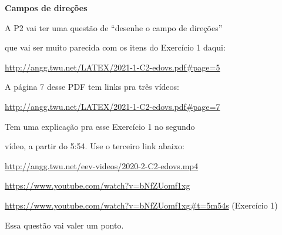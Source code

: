 \documentclass[oneside,12pt]{article}
\begin{document}
{\bf Campos de direções}

A P2 vai ter uma questão de ``desenhe o campo de direções''

que vai ser muito parecida com os itens do Exercício 1 daqui:

\ssk

{\scriptsize

\url{http://angg.twu.net/LATEX/2021-1-C2-edovs.pdf#page=5}

}

\ssk

A página 7 desse PDF tem links pra três vídeos:

\ssk

{\scriptsize

\url{http://angg.twu.net/LATEX/2021-1-C2-edovs.pdf#page=7}

}

\ssk

Tem uma explicação pra esse Exercício 1 no segundo

vídeo, a partir do 5:54. Use o terceiro link abaixo:

{\scriptsize

\ssk

\url{http://angg.twu.net/eev-videos/2020-2-C2-edovs.mp4}

\url{https://www.youtube.com/watch?v=bNfZUomf1xg}

\url{https://www.youtube.com/watch?v=bNfZUomf1xg\#t=5m54s} (Exercício 1)

}

\msk

Essa questão vai valer um ponto.


\newpage




\newpage


\end{document}
